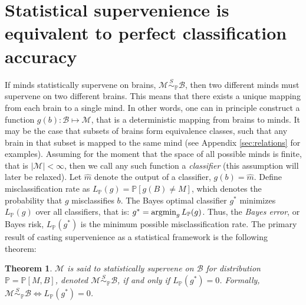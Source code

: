 \documentclass{article}
\newcommand{\mB}{\mathcal{B}}
\newcommand{\mM}{\mathcal{M}}
\newcommand{\PP}{\mathbb{P}}           %
\newcommand{\II}{\mathbb{I}}           %
\providecommand{\mc}[1]{\mathcal{#1}}
\providecommand{\mh}[1]{\widehat{#1}}
\newcommand{\argmin}{\operatornamewithlimits{argmin}}
\newcommand{\MsB}{\mM \overset{S}{\sim}_{\PP} \mB}
\newtheorem{thm}{Theorem}
\begin{document}



\section{Statistical supervenience is equivalent to perfect classification accuracy} %
\label{sub:theoretical_results}

If minds statistically supervene on brains, $\MsB$, then two different minds must supervene on two different brains.  This means that there exists a unique mapping from each brain to a single mind.  In other words, one can in principle construct a function $g(b): \mB \mapsto \mM$, that is a deterministic mapping from brains to minds.  It may be the case that subsets of brains form equivalence classes, such that any brain in that subset is mapped to the same mind (see Appendix \ref{sec:relations} for examples).  Assuming for the moment that the space of all possible minds is finite, that is $| \mM| < \infty$, then we call any such function a \emph{classifier} (this assumption will later be relaxed).  Let $\mh{m}$ denote the output of a classifier, $g(b)=\mh{m}$.  Define misclassification rate as
	$L_{\PP}(g) = \PP[g(B) \neq M]$, %
which denotes the probability that $g$ misclassifies $b$. The Bayes optimal classifier $g^*$ minimizes $L_{\PP}(g)$ over all classifiers, that is:
	$g^* = \argmin_{g} L_{\PP}(g)$.
Thus, the \emph{Bayes error}, or Bayes risk, $L_{\PP}(g^*)$ is the minimum possible misclassification rate. The primary result of casting supervenience as a statistical framework is the following theorem: 
\begin{thm}
\label{thm1} 
$\mM$ is said to \textit{statistically supervene} on $\mB$ for distribution $\PP=\PP[M,B]$, denoted $\mM \overset{S}{\sim}_{\PP} \mB$, if and only if $L_{\PP}(g^*) = 0$. Formally, \mbox{$\MsB \Leftrightarrow L_{\PP}(g^*)=0$}.  
\end{thm}
\end{document}
